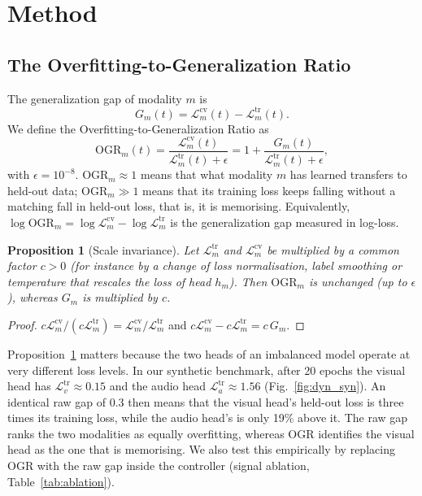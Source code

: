 \documentclass[fleqn,10pt]{wlscirep}
\newtheorem{proposition}{Proposition}
\newcommand{\Ltr}{\mathcal{L}^{\mathrm{tr}}}
\newcommand{\Lcv}{\mathcal{L}^{\mathrm{cv}}}
\newcommand{\OGR}{\mathrm{OGR}}
\begin{document}
\section*{Method}
\subsection*{The Overfitting-to-Generalization Ratio}
The generalization gap of modality $m$ is
\begin{equation}
G_m(t)=\Lcv_m(t)-\Ltr_m(t).
\label{eq:gap}
\end{equation}
We define the Overfitting-to-Generalization Ratio as
\begin{equation}
\OGR_m(t)=\frac{\Lcv_m(t)}{\Ltr_m(t)+\epsilon}=1+\frac{G_m(t)}{\Ltr_m(t)+\epsilon},
\label{eq:ogr}
\end{equation}
with $\epsilon=10^{-8}$. $\OGR_m\approx1$ means that what modality $m$ has learned transfers to held-out data; $\OGR_m\gg1$ means that its training loss keeps falling without a matching fall in held-out loss, that is, it is memorising. Equivalently, $\log\OGR_m=\log\Lcv_m-\log\Ltr_m$ is the generalization gap measured in log-loss.

\begin{proposition}[Scale invariance]
\label{prop:scale}
Let $\Ltr_m$ and $\Lcv_m$ be multiplied by a common factor $c>0$ (for instance by a change of loss normalisation, label smoothing or temperature that rescales the loss of head $h_m$). Then $\OGR_m$ is unchanged (up to $\epsilon$), whereas $G_m$ is multiplied by $c$.
\end{proposition}
\begin{proof}
$c\Lcv_m/(c\Ltr_m)=\Lcv_m/\Ltr_m$ and $c\Lcv_m-c\Ltr_m=c\,G_m$.
\end{proof}

Proposition~\ref{prop:scale} matters because the two heads of an imbalanced model operate at very different loss levels. In our synthetic benchmark, after 20 epochs the visual head has $\Ltr_v\approx0.15$ and the audio head $\Ltr_a\approx1.56$ (Fig.~\ref{fig:dyn_syn}). An identical raw gap of $0.3$ then means that the visual head's held-out loss is three times its training loss, while the audio head's is only 19\% above it. The raw gap ranks the two modalities as equally overfitting, whereas OGR identifies the visual head as the one that is memorising. We also test this empirically by replacing OGR with the raw gap inside the controller (signal ablation, Table~\ref{tab:ablation}).
\end{document}
